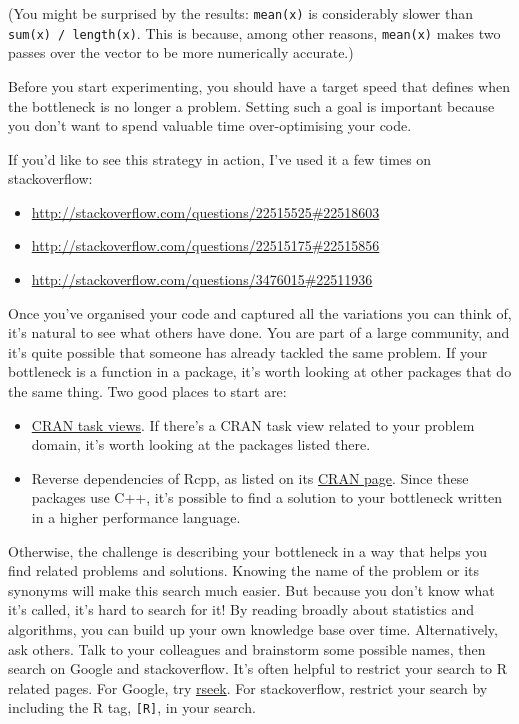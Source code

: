 (You might be surprised by the results: \texttt{mean(x)} is considerably
slower than \texttt{sum(x) / length(x)}. This is because, among other
reasons, \texttt{mean(x)} makes two passes over the vector to be more
numerically accurate.)

Before you start experimenting, you should have a target speed that
defines when the bottleneck is no longer a problem. Setting such a goal
is important because you don't want to spend valuable time
over-optimising your code.

If you'd like to see this strategy in action, I've used it a few times
on stackoverflow:

\begin{itemize}
\itemsep1pt\parskip0pt
\item
  \url{http://stackoverflow.com/questions/22515525\#22518603}
\item
  \url{http://stackoverflow.com/questions/22515175\#22515856}
\item
  \url{http://stackoverflow.com/questions/3476015\#22511936}
\end{itemize}


Once you've organised your code and captured all the variations you can
think of, it's natural to see what others have done. You are part of a
large community, and it's quite possible that someone has already
tackled the same problem. If your bottleneck is a function in a package,
it's worth looking at other packages that do the same thing. Two good
places to start are:

\begin{itemize}
\item
  \href{http://cran.rstudio.com/web/views/}{CRAN task views}. If there's
  a CRAN task view related to your problem domain, it's worth looking at
  the packages listed there.
\item
  Reverse dependencies of Rcpp, as listed on its
  \href{http://cran.r-project.org/web/packages/Rcpp}{CRAN page}. Since
  these packages use C++, it's possible to find a solution to your
  bottleneck written in a higher performance language.
\end{itemize}

Otherwise, the challenge is describing your bottleneck in a way that
helps you find related problems and solutions. Knowing the name of the
problem or its synonyms will make this search much easier. But because
you don't know what it's called, it's hard to search for it! By reading
broadly about statistics and algorithms, you can build up your own
knowledge base over time. Alternatively, ask others. Talk to your
colleagues and brainstorm some possible names, then search on Google and
stackoverflow. It's often helpful to restrict your search to R related
pages. For Google, try \href{http://www.rseek.org/}{rseek}. For
stackoverflow, restrict your search by including the R tag,
\texttt{{[}R{]}}, in your search. 

